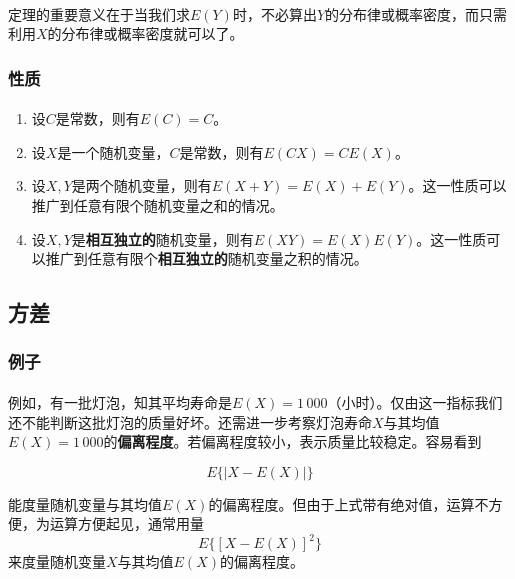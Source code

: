 \paragraph{}
定理的重要意义在于当我们求$E(Y)$时，不必算出$Y$的分布律或概率密度，而只需利用$X$的分布律或概率密度就可以了。

\subsubsection{性质}
\paragraph{}
\begin{enumerate}
  \item 设$C$是常数，则有$E(C)=C$。
  \item 设$X$是一个随机变量，$C$是常数，则有$E(CX)=CE(X)$。
  \item 设$X,Y$是两个随机变量，则有$E(X+Y)=E(X) + E(Y)$。这一性质可以推广到任意有限个随机变量之和的情况。
  \item 设$X,Y$是\textbf{相互独立的}随机变量，则有$E(XY)=E(X)E(Y)$。这一性质可以推广到任意有限个\textbf{相互独立的}随机变量之积的情况。
\end{enumerate}

\subsection{方差}
\subsubsection{例子}
\paragraph{}
例如，有一批灯泡，知其平均寿命是$E(X)=1\,000$（小时）。仅由这一指标我们还不能判断这批灯泡的质量好坏。还需进一步考察灯泡寿命$X$与其均值$E(X)=1\,000$的\textbf{偏离程度}。若偏离程度较小，表示质量比较稳定。容易看到

\begin{equation*}
  E\{|X-E(X)|\}
\end{equation*}

能度量随机变量与其均值$E(X)$的偏离程度。但由于上式带有绝对值，运算不方便，为运算方便起见，通常用量
\begin{equation*}
  E\{[X-E(X)]^2\}
\end{equation*}
来度量随机变量$X$与其均值$E(X)$的偏离程度。

